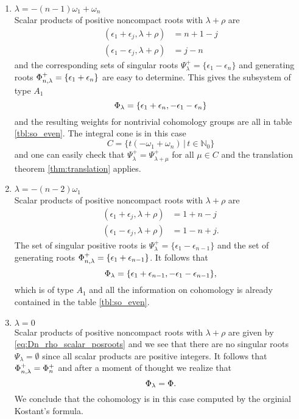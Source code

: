 \begin{enumerate}
 \item $ \lambda = -(n-1)\omega_1 + \omega_n$\\
  Scalar products of positive noncompact roots with $\lambda+\rho$ are
  \begin{align*}
    (\epsilon_1 + \epsilon_j, \lambda+\rho) & = n+1-j\\
    (\epsilon_1 - \epsilon_j, \lambda+\rho) & = j-n
  \end{align*}
  and the corresponding sets of singular roots $\Psi^+_\lambda = \{ \epsilon_1-\epsilon_n\}$ and generating roots $\Phi^+_{n,\lambda} = \{ \epsilon_1 + \epsilon_n \}$ are easy to determine. This gives the subsystem of type $A_1$
  \[
   \Phi_\lambda = \{ \epsilon_1 + \epsilon_n, -\epsilon_1 - \epsilon_n\}
  \]
  and the resulting weights for nontrivial cohomology groups are all in table \ref{tbl:so_even}. The integral cone is in this case \[C = \{t(-\omega_1 + \omega_n) \,|\, t\in\mathbb{N}_0 \}\] and one can easily check that $\Psi^+_\lambda = \Psi^+_{\lambda+\mu}$ for all $\mu \in C$ and the translation theorem \ref{thm:translation} applies.


 \item $ \lambda = -(n-2)\omega_1$\\
  Scalar products of positive noncompact roots with $\lambda+\rho$ are
  \begin{align*}
    (\epsilon_1 + \epsilon_j, \lambda+\rho) & = 1+n-j\\
    (\epsilon_1 - \epsilon_j, \lambda+\rho) & = 1-n+j.
  \end{align*}
  The set of singular positive roots is $\Psi^+_\lambda = \{ \epsilon_1 - \epsilon_{n-1} \}$ and the set of generating roots $\Phi^+_{n,\lambda} = \{ \epsilon_1 + \epsilon_{n-1} \}$. It  follows that
  \[
   \Phi_\lambda = \{\epsilon_1 + \epsilon_{n-1},-\epsilon_1 -\epsilon_{n-1} \},
  \]
  which is of type $A_1$ and all the information on cohomology is already contained in the table \ref{tbl:so_even}. %
  
 \item $ \lambda = 0$\\
  Scalar products of positive noncompact roots with $\lambda+\rho$ are given by \eqref{eq:Dn_rho_scalar_posroots} and we see that there are no singular roots $\Psi_\lambda = \emptyset$ since all scalar products are positive integers. It follows that $\Phi^+_{n,\lambda} = \Phi^+_n$ and after a moment of thought we realize that 
  \[
   \Phi_\lambda = \Phi.
  \]
  We conclude that the cohomology is in this case computed by the orginial Kostant's formula. %
  

\end{enumerate}
